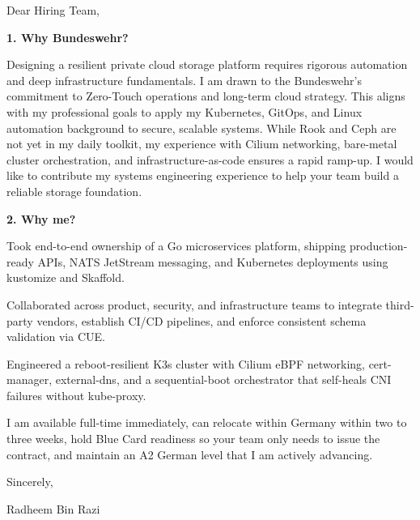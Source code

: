 \documentclass[11pt,a4paper]{coverletter}
\begin{document}

\opening{Dear Hiring Team,}

\vspace{8pt}\noindent\textbf{1. Why Bundeswehr?}\par\vspace{3pt}

Designing a resilient private cloud storage platform requires rigorous automation and deep infrastructure fundamentals. I am drawn to the Bundeswehr’s commitment to Zero-Touch operations and long-term cloud strategy. This aligns with my professional goals to apply my Kubernetes, GitOps, and Linux automation background to secure, scalable systems. While Rook and Ceph are not yet in my daily toolkit, my experience with Cilium networking, bare-metal cluster orchestration, and infrastructure-as-code ensures a rapid ramp-up. I would like to contribute my systems engineering experience to help your team build a reliable storage foundation.

\vspace{8pt}\noindent\textbf{2. Why me?}\par\vspace{3pt}

\bullets

  \item Took end-to-end ownership of a Go microservices platform, shipping production-ready APIs, NATS JetStream messaging, and Kubernetes deployments using kustomize and Skaffold.

  \item Collaborated across product, security, and infrastructure teams to integrate third-party vendors, establish CI/CD pipelines, and enforce consistent schema validation via CUE.

  \item Engineered a reboot-resilient K3s cluster with Cilium eBPF networking, cert-manager, external-dns, and a sequential-boot orchestrator that self-heals CNI failures without kube-proxy.

\bulletsend

I am available full-time immediately, can relocate within Germany within two to three weeks, hold Blue Card readiness so your team only needs to issue the contract, and maintain an A2 German level that I am actively advancing.

\closing{Sincerely,}{Radheem Bin Razi}

\clearpage
{}
\end{document}
